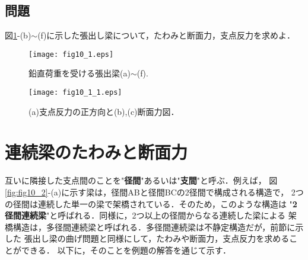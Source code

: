 \documentclass[10pt,a4j]{jarticle}
\begin{document}
\subsection{問題}
図\ref{fig:fig10_1}-(b)$\sim$(f)に示した張出し梁について，たわみと断面力，支点反力を求めよ．
\begin{figure}[h]
	\begin{center}
	\texttt{[image: fig10\_1.eps]} 
	\end{center}
	\caption{
	鉛直荷重を受ける張出梁(a)$\sim$(f).
	} 
	\label{fig:fig10_1}
\end{figure}
\begin{figure}[h]
	\begin{center}
	\texttt{[image: fig10\_1\_1.eps]} 
	\end{center}
	\caption{
	(a)支点反力の正方向と(b),(c)断面力図．
	} 
	\label{fig:fig10_1_1}
\end{figure}
%
%
%
\section{連続梁のたわみと断面力}
互いに隣接した支点間のことを"{\bf 径間}"あるいは"{\bf 支間}"と呼ぶ．例えば，
図\ref{fig:fig10_2}-(a)に示す梁は，径間ABと径間BCの2径間で構成される構造で，
2つの径間は連続した単一の梁で架橋されている．そのため，このような構造は
"{\bf 2径間連続梁}"と呼ばれる．同様に，2つ以上の径間からなる連続した梁による
架橋構造は，多径間連続梁と呼ばれる．多径間連続梁は不静定構造だが，前節に示した
張出し梁の曲げ問題と同様にして，たわみや断面力，支点反力を求めることができる．
以下に，そのことを例題の解答を通じて示す．
\end{document}
